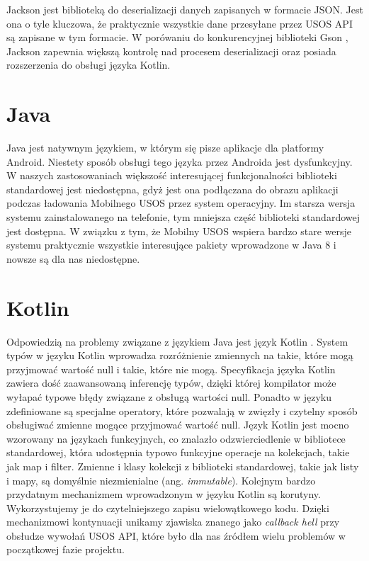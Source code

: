 \documentclass{pracamgr}
\begin{document}
Jackson \cite{jackson} jest biblioteką do deserializacji danych zapisanych w
formacie JSON. Jest ona o tyle kluczowa, że praktycznie wszystkie dane przesyłane
przez USOS API są zapisane w tym formacie. W porówaniu do konkurencyjnej biblioteki
Gson \cite{gson}, Jackson zapewnia większą kontrolę nad procesem deserializacji
oraz posiada rozszerzenia do obsługi języka Kotlin.

\section{Java}

Java \cite{java} jest natywnym językiem, w którym się pisze aplikacje dla platformy
Android. Niestety sposób obsługi tego języka przez Androida jest dysfunkcyjny.
W naszych zastosowaniach większość interesującej funkcjonalności biblioteki
standardowej jest niedostępna, gdyż jest ona podłączana do obrazu aplikacji podczas
ładowania Mobilnego USOS przez system operacyjny. Im starsza wersja systemu
zainstalowanego na telefonie, tym mniejsza część biblioteki standardowej jest
dostępna. W związku z tym, że Mobilny USOS wspiera bardzo stare wersje systemu
praktycznie wszystkie interesujące pakiety wprowadzone w Java 8 i nowsze są dla
nas niedostępne.

\section{Kotlin}

Odpowiedzią na problemy związane z językiem Java jest język Kotlin \cite{kotlin}.
System typów w języku Kotlin wprowadza rozróżnienie zmiennych na takie, które mogą
przyjmować wartość null i takie, które nie mogą. Specyfikacja języka Kotlin zawiera
dość zaawansowaną inferencję typów, dzięki której kompilator może wyłapać typowe błędy
związane z obsługą wartości null. Ponadto w języku zdefiniowane są specjalne
operatory, które pozwalają w zwięzły i czytelny sposób obsługiwać zmienne mogące
przyjmować wartość null. Język Kotlin jest mocno wzorowany na językach funkcyjnych,
co znalazło odzwierciedlenie w bibliotece standardowej, która udostępnia typowo
funkcyjne operacje na kolekcjach, takie jak map i filter. Zmienne i klasy
kolekcji z biblioteki standardowej, takie jak listy i mapy, są domyślnie niezmienialne
(ang. \textit{immutable}). Kolejnym bardzo przydatnym mechanizmem wprowadzonym w
języku Kotlin są korutyny. Wykorzystujemy je do czytelniejszego zapisu wielowątkowego
kodu. Dzięki mechanizmowi kontynuacji unikamy zjawiska znanego jako \textit{callback hell}
przy obsłudze wywołań USOS API, które było dla nas źródłem wielu problemów w
początkowej fazie projektu.
\end{document}
